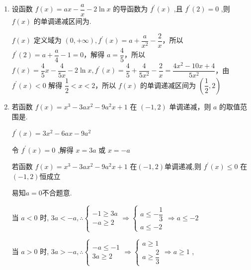 \begin{enumerate}
    \item 设函数 $f\left( x\right)  = {ax} - \dfrac{a}{x} - 2\ln x$ 的导函数为 ${f}^{\prime }\left( x\right)$ ,且 ${f}^{\prime }\left( 2\right)  = 0$ ,则 $f\left( x\right)$ 的单调递减区间为.
    \begin{jieda}
        $f\left( x\right)$ 定义域为 $\left( {0, + \infty }\right) ,{f}^{\prime }\left( x\right)  = a + \dfrac{a}{{x}^{2}} - \dfrac{2}{x}$，所以 ${f}^{\prime }\left( 2\right)  = a + \dfrac{a}{4} - 1 = 0$，解得 $a = \dfrac{4}{5}$，所以 $f\left( x\right)  = \dfrac{4}{5}x - \dfrac{4}{5x} - 2\ln x,{f}^{\prime }\left( x\right)  = \dfrac{4}{5} + \dfrac{4}{5{x}^{2}} - \dfrac{2}{x} = \dfrac{4{x}^{2} - {10x} + 4}{5{x}^{2}}$，由 ${f}^{\prime }\left( x\right)  < 0$ 解得 $\dfrac{1}{2} < x < 2$，所以 $f\left( x\right)$ 的单调递减区间为 $\left( {\dfrac{1}{2},2}\right)$
    \end{jieda}

    \item 若函数 $f\left( x\right)  = {x}^{3} - {3a}{x}^{2} - 9{a}^{2}x + 1$ 在 $\left( {-1,2}\right)$ 单调递减，则 $a$ 的取值范围是.
    \begin{jieda}
        ${f}^{\prime }\left( x\right)  = 3{x}^{2} - {6ax} - 9{a}^{2}$
        
        令 ${f}^{\prime }\left( x\right)  = 0$ ,解得 $x = {3a}$ 或 $x =  - a$
        
        若函数 $f\left( x\right)  = {x}^{3} - {3a}{x}^{2} - 9{a}^{2}x + 1$ 在$(-1,2)$单调递减,则 ${f}^{\prime }\left( x\right)  \leq  0$ 在$(-1,2)$恒成立

        易知$a = 0$不合题意.
        
        当 $a < 0$ 时, ${3a} <  - a,\therefore \left\{  {\begin{array}{l}  - 1 \geq  {3a} \\   - a \geq  2 \end{array} \Longrightarrow  \left\{  {\begin{array}{l} a \leq   - \dfrac{1}{3} \\  a \leq   - 2 \end{array} \Longrightarrow  a \leq   - 2}\right. }\right.$
        
        当 $a > 0$ 时, ${3a} >  - a,\therefore \left\{  {\begin{array}{l}  - a \leq   - 1 \\  {3a} \geq  2 \end{array} \Longrightarrow  \left\{  {\begin{array}{l} a \geq  1 \\  a \geq  \dfrac{2}{3} \end{array} \Longrightarrow  a \geq  1}\right. }\right.$ ,
        

\end{jieda}
\end{enumerate}
